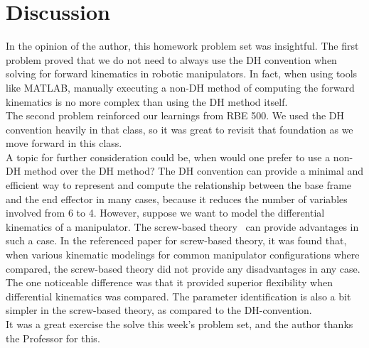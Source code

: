\documentclass[conference]{IEEEtran}
\begin{document}
\section{Discussion}
In the opinion of the author, this homework problem set was insightful. The
first problem proved that we do not need to always use the DH convention
when solving for forward kinematics in robotic manipulators. In fact, when
using tools like MATLAB, manually executing a non-DH method of
computing the forward kinematics is no more complex than using the DH method
itself.\\
The second problem reinforced our learnings from RBE 500. We used the DH
convention heavily in that class, so it was great to revisit that foundation
as we move forward in this class.\\
A topic for further consideration could be, when would one prefer to use
a non-DH method over the DH method? The DH convention can provide a minimal
and efficient way to represent and compute the relationship between the base
frame and the end effector in many cases, because it reduces the number of
variables involved from 6 to 4. However, suppose we want to model the
differential kinematics of a manipulator. The screw-based theory~\cite{Rocha2011}
can provide advantages in such a case. In the referenced paper for screw-based
theory, it was found that, when
various kinematic modelings for common manipulator configurations where
compared, the screw-based theory did not provide any disadvantages in any
case. The one noticeable difference was that it provided superior flexibility
when differential kinematics was compared.
The parameter identification is also a bit simpler in the screw-based theory, as
compared to the DH-convention.\\
It was a great exercise the solve this week's problem set, and the author thanks
the Professor for this.


\end{document}
